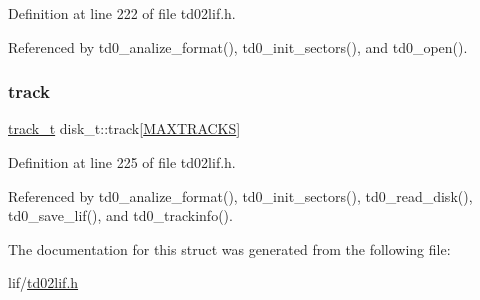 Definition at line 222 of file td02lif.\+h.



Referenced by td0\+\_\+analize\+\_\+format(), td0\+\_\+init\+\_\+sectors(), and td0\+\_\+open().

\mbox{\label{structdisk__t_a6498dff29cc11a772be6e0cabb54520f}} 
\subsubsection{\texorpdfstring{track}{track}}
{\footnotesize\ttfamily \hyperlink{structtrack__t}{track\+\_\+t} disk\+\_\+t\+::track\mbox{[}\hyperlink{td02lif_8h_ade239296a2facdacc8b64d0791e2d806}{M\+A\+X\+T\+R\+A\+C\+KS}\mbox{]}}



Definition at line 225 of file td02lif.\+h.



Referenced by td0\+\_\+analize\+\_\+format(), td0\+\_\+init\+\_\+sectors(), td0\+\_\+read\+\_\+disk(), td0\+\_\+save\+\_\+lif(), and td0\+\_\+trackinfo().



The documentation for this struct was generated from the following file\+:\begin{DoxyCompactItemize}
\item 
lif/\hyperlink{td02lif_8h}{td02lif.\+h}\end{DoxyCompactItemize}
